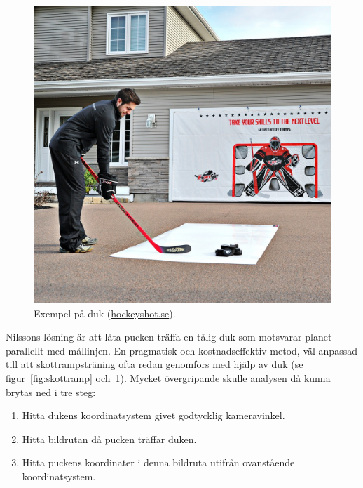 \documentclass[a4paper,12pt]{article}
\begin{document}
\begin{figure}[ht]
  \centering
  \includegraphics[width=\linewidth]{photos/shooting-tarp.jpg}
  \caption{Exempel på duk
  (\href{http://www.hockeyshot.se/HockeyShot-Extreme-Shooting-Tarp-p/target-tarp-032.htm}{hockeyshot.se}).
  \label{fig:duk}}
\end{figure}

Nilssons lösning är att låta pucken träffa en tålig duk som motsvarar planet
parallellt med mållinjen. En pragmatisk och kostnadseffektiv metod, väl
anpassad till att skottrampsträning ofta redan genomförs med hjälp av duk
(se figur~\ref{fig:skottramp} och~\ref{fig:duk}). Mycket övergripande skulle
analysen då kunna brytas ned i tre steg:

\begin{enumerate}
  \item \label{enum:step1} Hitta dukens koordinatsystem givet godtycklig
    kameravinkel.
  \item \label{enum:step2} Hitta bildrutan då pucken träffar duken.
  \item \label{enum:step3} Hitta puckens koordinater i denna bildruta utifrån
    ovanstående koordinatsystem.
\end{enumerate}
\end{document}

